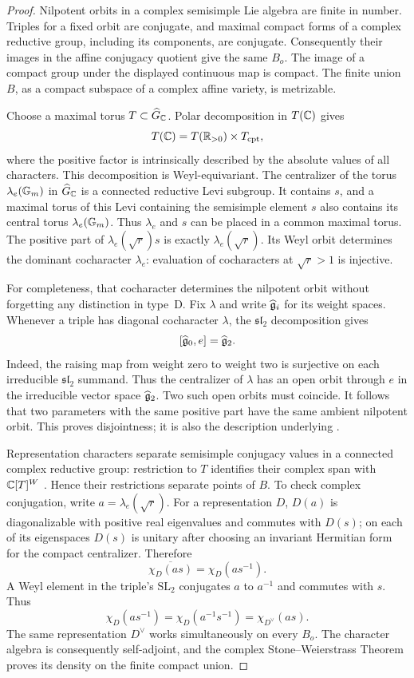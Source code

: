 \begin{proof}
Nilpotent orbits in a complex semisimple Lie algebra are finite in number.
Triples for a fixed orbit are conjugate, and maximal compact forms of a
complex reductive group, including its components, are conjugate.
Consequently their images in the affine conjugacy quotient give the same
$B_o$. The image of a compact group under the displayed continuous map is
compact. The finite union $B$, as a compact subspace of a complex affine
variety, is metrizable.

Choose a maximal torus $T\subset\widehat G_\mathbb C$. Polar decomposition in
$T(\mathbb C)$ gives
\[
T(\mathbb C)=T(\mathbb R_{>0})\times T_{\mathrm{cpt}},
\]
where the positive factor is intrinsically described by the absolute
values of all characters. This decomposition is Weyl-equivariant.
The centralizer of the torus $\lambda_e(\mathbb G_m)$ in $\widehat G_\mathbb C$ is a
connected reductive Levi subgroup. It contains $s$, and a maximal
torus of this Levi containing the semisimple element $s$ also contains
its central torus $\lambda_e(\mathbb G_m)$. Thus $\lambda_e$ and $s$ can be
placed in a common maximal torus. The positive part of
$\lambda_e(\sqrt r)s$ is exactly $\lambda_e(\sqrt r)$. Its Weyl orbit
determines the dominant cocharacter $\lambda_e$: evaluation of
cocharacters at $\sqrt r>1$ is injective.

For completeness, that cocharacter determines the nilpotent orbit
without forgetting any distinction in type~D. Fix $\lambda$ and write
$\widehat{\mathfrak g}_i$ for its weight spaces. Whenever a triple has diagonal
cocharacter $\lambda$, the $\mathfrak{sl}_2$ decomposition gives
\[
[\widehat{\mathfrak g}_0,e]=\widehat{\mathfrak g}_2.
\]
Indeed, the raising map from weight zero to weight two is surjective
on each irreducible $\mathfrak{sl}_2$ summand. Thus the centralizer of
$\lambda$ has an open orbit through $e$ in the irreducible vector space
$\widehat{\mathfrak g}_2$. Two such open orbits must coincide. It follows that two
parameters with the same positive part have the same ambient nilpotent
orbit. This proves disjointness; it is also the description underlying
\cite[Lemma~3.1.3]{GLR}.

Representation characters separate semisimple conjugacy values in a
connected complex reductive group: restriction to $T$ identifies their complex
span with $\mathbb C[T]^W$ \cite[Theorem~22.38]{MilneAG}.
Hence their restrictions separate points of $B$.
To check complex conjugation, write $a=\lambda_e(\sqrt r)$.
For a representation $D$, $D(a)$ is diagonalizable with positive real
eigenvalues and commutes with $D(s)$; on each of its eigenspaces $D(s)$
is unitary after choosing an invariant Hermitian form for the compact
centralizer. Therefore
\[
\overline{\chi_D(as)}=\chi_D(as^{-1}).
\]
A Weyl element in the triple's $\mathrm{SL}_2$ conjugates $a$ to
$a^{-1}$ and commutes with $s$. Thus
\[
\chi_D(as^{-1})=\chi_D(a^{-1}s^{-1})=\chi_{D^\vee}(as).
\]
The same representation $D^\vee$ works simultaneously on every $B_o$.
The character algebra is consequently self-adjoint, and the complex
Stone--Weierstrass Theorem proves its density on the finite compact union.


\end{proof}
